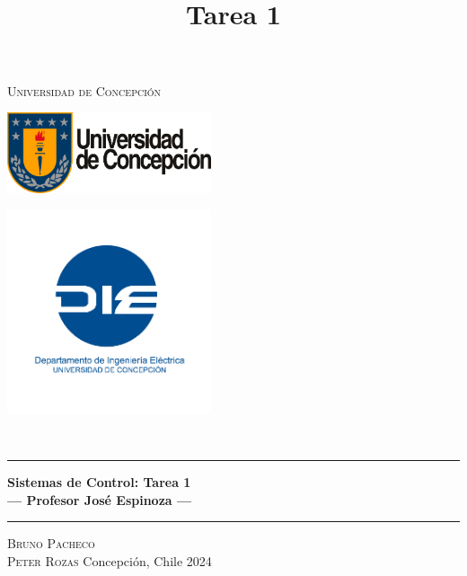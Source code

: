 \title{{\Large \\ Tarea 1 \\[0.1 cm]}}

\pagestyle{fancy}
\fancyhf{}
\lhead{\thetitle}
\cfoot{\thepage}

\begin{titlepage}
    \newcommand{\drop}{0.1\textheight}
    \vspace*{\drop}
    \begin{center}
    {\LARGE\textsc{Universidad de Concepción}}\\[\drop]
    \begin{minipage}{0.47\linewidth}
        \centering
        {\includegraphics[width=6cm]{extras/logo_udec.png}}
    \end{minipage}
    \begin{minipage}{0.47\linewidth}  %
        \centering
        {\includegraphics[width=6cm]{extras/logo_die.png}}
    \end{minipage}\\[\drop]
    \rule{\textwidth}{1pt}\par
    \vspace{0.5\baselineskip}
    {\huge\bfseries Sistemas de Control: Tarea 1\\
    \large --- Profesor José Espinoza ---}\\[0.5\baselineskip]
    \rule{\textwidth}{1pt}\par
    \vfill
    {\Large\textsc{Bruno Pacheco \\ Peter Rozas}}
    \vfill
    Concepción, Chile
    \vfill
    {\large 2024}
    \end{center}
\end{titlepage}


\fancyfoot[C]{\thepage}  %
\renewcommand{\footrulewidth}{0.4pt}
